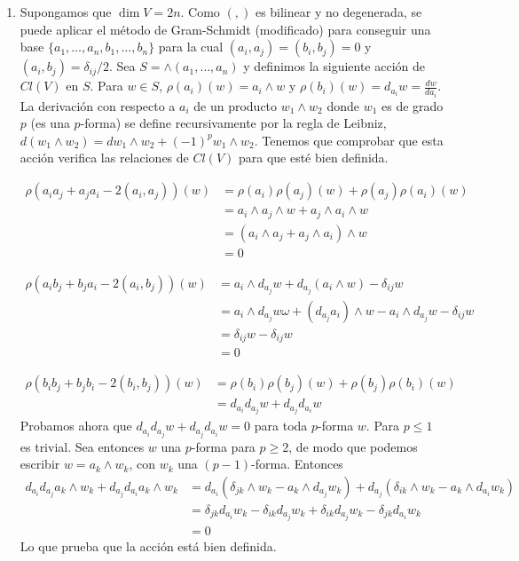 \documentclass[twoside]{article}
\begin{document}
\begin{enumerate}
\item Supongamos que $\dim V=2n$. Como $(,)$ es bilinear y no degenerada, se puede aplicar el método de Gram-Schmidt (modificado) para conseguir una base $\{a_1,\dots, a_n,b_1,\dots, b_n\}$ para la cual $(a_i,a_j)=(b_i,b_j)=0$ y $(a_i,b_j)=\delta_{ij}/2$. Sea $S=\land (a_1,\dots, a_n)$ y definimos la siguiente acción de $Cl(V)$ en $S$. Para $w\in S$, $\rho(a_i)(w)=a_i\land w$ y $\rho(b_i)(w)=d_{a_i}w=\frac{dw}{da_i}$. La derivación con respecto a $a_i$ de un producto $w_1\land w_2$ donde $w_1$ es de grado $p$ (es una $p$-forma) se define recursivamente por la regla de Leibniz, $d(w_1\land w_2)=dw_1\land w_2+(-1)^pw_1\land w_2$. Tenemos que comprobar que esta acción verifica las relaciones de $Cl(V)$ para que esté bien definida.

\begin{align*}
\rho(a_i a_j + a_j a_i - 2( a_i, a_j))(w)
&= \rho(a_i)\rho(a_j)(w) + \rho(a_j)\rho(a_i)(w) \\
&= a_i \wedge a_j \wedge w + a_j \wedge a_i \wedge w \\
&= (a_i \wedge a_j + a_j \wedge a_i) \wedge w \\
&=0
\end{align*}

\begin{align*}
\rho(a_i b_j + b_j a_i - 2( a_i, b_j))(w)
&= a_i \wedge d_{a_j}w + d_{a_j}(a_i \wedge w) -
\delta_{ij}w \\
&= a_i \wedge d_{a_j}w\omega + (d_{a_j}a_i) \wedge w -
a_i \wedge d_{a_j}w - \delta_{ij}w\\
&= \delta_{ij}w - \delta_{ij}w \\
&= 0
\end{align*}

\begin{align*}
\rho(b_i b_j + b_j b_i - 2( b_i, b_j))(w)
&= \rho(b_i)\rho(b_j)(w) + \rho(b_j)\rho(b_i)(w) \\
&= d_{a_i} d_{a_j}w + d_{a_j} d_{a_i}w 
\end{align*}
Probamos ahora que $d_{a_i} d_{a_j}w + d_{a_j} d_{a_i}w=0$ para toda $p$-forma $w$. Para $p\leq 1$ es trivial. Sea entonces $w$ una $p$-forma para $p\geq 2$, de modo que podemos escribir $w=a_k\land w_k$, con $w_k$ una $(p-1)$-forma. Entonces
\begin{align*}
d_{a_i}d_{a_j}a_k\land w_k+d_{a_j}d_{a_i}a_k\land w_k&=d_{a_i}(\delta_{jk}\land w_k-a_k\land d_{a_j}w_k)+d_{a_j}(\delta_{ik}\land w_k-a_k\land d_{a_i}w_k)\\
&=\delta_{jk} d_{a_i}w_k-\delta_{ik} d_{a_j}w_k+\delta_{ik}d_{a_j}w_k-\delta_{jk}d_{a_i}w_k\\
&=0
\end{align*}
Lo que prueba que la acción está bien definida.


\end{enumerate}
\end{document}
